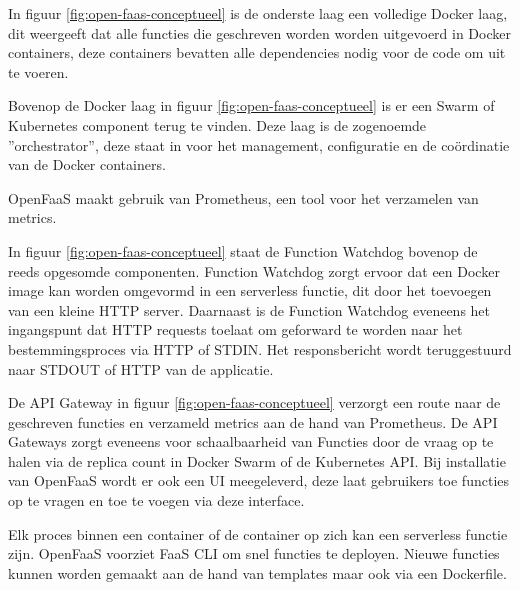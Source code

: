 \begin{description}[style=unboxed, labelwidth=\linewidth, listparindent =0pt]
    \item[Docker laag]
    In figuur \ref{fig:open-faas-conceptueel} is de onderste laag een volledige Docker laag, dit weergeeft dat alle functies die geschreven worden worden uitgevoerd in Docker containers, deze containers bevatten alle dependencies nodig voor de code om uit te voeren.
    \newline
    
    \item[Swarm/Kubernetes]
    Bovenop de Docker laag in figuur \ref{fig:open-faas-conceptueel} is er een Swarm of Kubernetes component terug te vinden. Deze laag is de zogenoemde ''orchestrator'', deze staat in voor het management, configuratie en de coördinatie van de Docker containers.
    \newline
    
    \item[Prometheus]
    OpenFaaS maakt gebruik van Prometheus, een tool voor het verzamelen van metrics.
    \newline
    
    \item[Function Watchdog]
    In figuur \ref{fig:open-faas-conceptueel} staat de Function Watchdog bovenop de reeds opgesomde componenten. Function Watchdog zorgt ervoor dat een Docker image kan worden omgevormd in een serverless functie, dit door het toevoegen van een kleine HTTP server. Daarnaast is de Function Watchdog eveneens het ingangspunt dat HTTP requests toelaat om geforward te worden naar het bestemmingsproces via HTTP of STDIN. Het responsbericht wordt teruggestuurd naar STDOUT of HTTP van de applicatie. \autocite{Ellis2019}
    \newline
    
    \item[API Gateway/UI Portal]
    De API Gateway in figuur \ref{fig:open-faas-conceptueel} verzorgt een route naar de geschreven functies en verzameld metrics aan de hand van Prometheus. De API Gateways zorgt eveneens voor schaalbaarheid van Functies door de vraag op te halen via de replica count in Docker Swarm of de Kubernetes API. Bij installatie van OpenFaaS wordt er ook een UI meegeleverd, deze laat gebruikers toe functies op te vragen en toe te voegen via deze interface. \autocite{Ellis2019} 
    \newline
    
    \item[CLI]
    Elk proces binnen een container of de container op zich kan een serverless functie zijn. OpenFaaS voorziet FaaS CLI om snel functies te deployen. Nieuwe functies kunnen worden gemaakt aan de hand van templates maar ook via een Dockerfile. \autocite{Ellis2019}  
\end{description}

